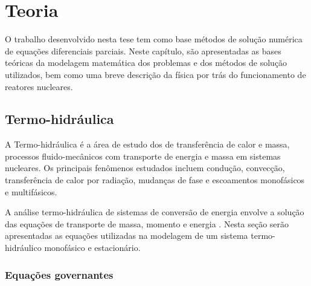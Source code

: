 \chapter{Teoria}
\label{chap:teoria}

O trabalho desenvolvido nesta tese tem como base métodos de
solução numérica de equações diferenciais parciais. Neste capítulo, são
apresentadas as bases teóricas da modelagem matemática
dos problemas e dos métodos de solução utilizados, bem como uma
breve descrição da física por trás do funcionamento de reatores
nucleares.



\section{Termo-hidráulica}
\label{sec:th}

A Termo-hidráulica é a área de estudo dos de transferência
de calor e massa, processos fluido-mecânicos com transporte de energia e
massa em sistemas nucleares. Os principais fenômenos estudados incluem condução,
convecção, transferência de calor por radiação, mudanças de fase e escoamentos
monofásicos e multifásicos.

A análise termo-hidráulica de sistemas de conversão de energia envolve a solução
das equações de transporte de massa, momento e energia \cite{Todreas2012}. Nesta seção serão apresentadas
as equações utilizadas na modelagem de um sistema termo-hidráulico monofásico e
estacionário.

\subsection{Equações governantes}
\label{subsec:eq}



